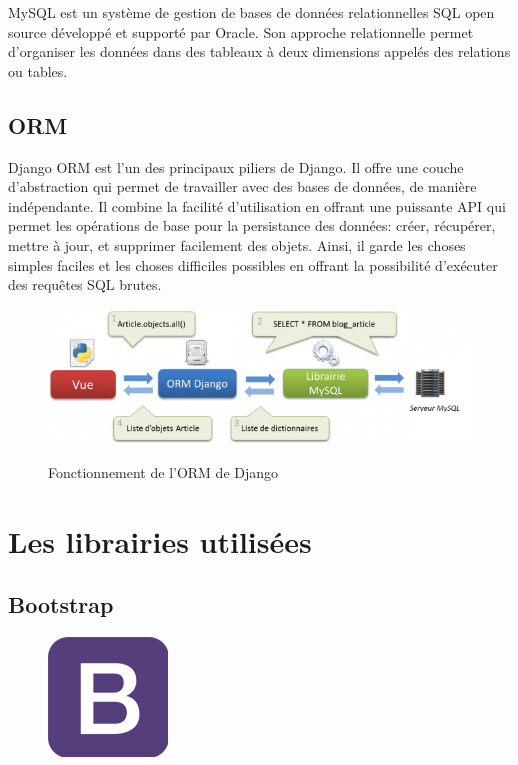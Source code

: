 MySQL est un système de gestion de bases de données relationnelles SQL open 
source développé et supporté par Oracle. Son approche relationnelle permet 
d'organiser les données dans des tableaux à deux dimensions appelés des 
relations ou tables\cite{47}.

\subsection{ORM}
Django ORM est l'un des principaux piliers de Django. Il offre une couche
d'abstraction qui permet de travailler avec des bases de données, de manière
indépendante. Il combine la facilité d'utilisation en offrant une puissante API
qui permet les opérations de base pour la persistance des données: créer,
récupérer, mettre à jour, et supprimer facilement des objets. Ainsi, il garde
les choses simples faciles et les choses difficiles possibles en offrant la
possibilité d’exécuter des requêtes SQL brutes\cite{48}.

\begin{figure}[h!]
    \centering
    \includegraphics[scale=0.8 ]{images/ORM.png}
    \label{fig77}
    \caption{Fonctionnement de l'ORM de Django \cite{49}}
    \label{}
\end{figure}

\clearpage       

\section{Les librairies utilisées}
\subsection{Bootstrap}
\begin{figure}
    \vspace{-22pt}
    \begin{center}
        \includegraphics[scale=0.36]{images/logo/bootstrap.png}
        \label{fig78}
    \end{center}
    \vspace{-20pt}
    \vspace{-10pt}
\end{figure}

